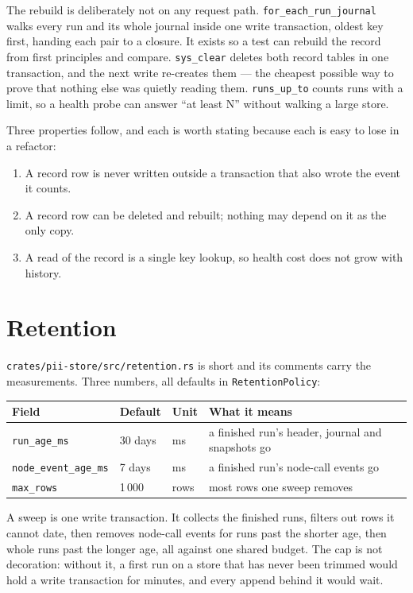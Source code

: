 The rebuild is deliberately not on any request path. \texttt{for\_each\_run\_journal} walks
every run and its whole journal inside one write transaction, oldest key first, handing each
pair to a closure. It exists so a test can rebuild the record from first principles and
compare. \texttt{sys\_clear} deletes both record tables in one transaction, and the next write
re-creates them --- the cheapest possible way to prove that nothing else was quietly reading
them. \texttt{runs\_up\_to} counts runs with a limit, so a health probe can answer ``at least
N'' without walking a large store.

Three properties follow, and each is worth stating because each is easy to lose in a refactor:

\begin{enumerate}
	\item A record row is never written outside a transaction that also wrote the event it
	counts.
	\item A record row can be deleted and rebuilt; nothing may depend on it as the only copy.
	\item A read of the record is a single key lookup, so health cost does not grow with
	history.
\end{enumerate}

\section{Retention}

\texttt{crates/pii-store/src/retention.rs} is short and its comments carry the measurements.
Three numbers, all defaults in \texttt{RetentionPolicy}:

\begin{longtable}{@{}p{}p{}p{}p{}@{}}
\toprule
\textbf{Field} & \textbf{Default} & \textbf{Unit} & \textbf{What it means} \\
\midrule
\endhead
\texttt{run\_age\_ms} & 30 days & ms & a finished run's header, journal and snapshots go \\
\texttt{node\_event\_age\_ms} & 7 days & ms & a finished run's node-call events go \\
\texttt{max\_rows} & 1\,000 & rows & most rows one sweep removes \\
\bottomrule
\end{longtable}

A sweep is one write transaction. It collects the finished runs, filters out rows it cannot
date, then removes node-call events for runs past the shorter age, then whole runs past the
longer age, all against one shared budget. The cap is not decoration: without it, a first run
on a store that has never been trimmed would hold a write transaction for minutes, and every
append behind it would wait.

